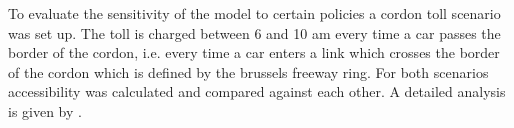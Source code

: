 To evaluate the sensitivity of the model to certain policies a cordon toll 
scenario was set up. The toll is charged between 6 and 10 am every time a car 
passes the border of the cordon, i.e. every time a car enters a link which 
crosses the border of the cordon which is defined by the brussels freeway ring. 
For both scenarios accessibility was calculated and compared against each other. 
A detailed analysis is given by \citet{RoederNagel2013SketchPlanningBrussels}.


